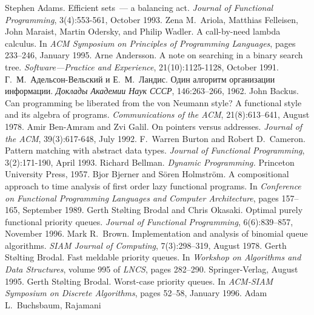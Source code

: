 \begin{thebibliography}{XXXXXXX}
 Stephen Adams. Efficient sets~--- a
  balancing act. \textit{Journal of Functional Programming},
  3(4):553-561, October 1993.
 Zena M.~Ariola, Matthias
  Felleisen, John Maraist, Martin Odersky, and Philip Wadler. A
  call-by-need lambda calculus. In \textit{ACM Symposium on Principles
  of Programming Languages}, pages 233--246, January 1995.
 Arne Andersson. A note on searching in
  a binary search tree. \textit{Software---Practice and Experience},
  21(10):1125-1128, October 1991.
 Г.~М.~Адельсон-Вельский
  и Е.~М.~Ландис. Один алгоритм организации
  информации. \textit{Доклады Академии Наук СССР}, 146:263--266, 1962.
 John Backus. Can programming be liberated
  from the von Neumann style? A functional style and its algebra of
  programs. \textit{Communications of the ACM}, 21(8):613--641, August 1978.
 Amir Ben-Amram and Zvi Galil. On
  pointers versus addresses. \textit{Journal of the ACM},
  39(3):617-648, July 1992.
 F.~Warren Burton and
  Robert D.~Cameron. Pattern matching with abstract data
  types. \textit{Journal of Functional Programming}, 3(2):171-190,
  April 1993.
 Richard Bellman. \textit{Dynamic
    Programming.}\/ Princeton University Press, 1957.
 Bjor Bjerner and S\"oren
  Holmstr\"om. A compositional approach to time analysis of first
  order lazy functional programs. In \textit{Conference on Functional
    Programming Languages and Computer Architecture}, pages 157--165,
  September 1989.
 Gerth St\o{}lting Brodal and Chris
  Okasaki. Optimal purely functional priority queues. \textit{Journal
    of Functional Programming}, 6(6):839--857, November 1996.
 Mark R.~Brown. Implementation and analysis
  of binomial queue algorithms. \textit{SIAM Journal of Computing},
  7(3):298--319, August 1978.
 Gerth St\o{}lting Brodal. Fast meldable
  priority queues. In \textit{Workshop on Algorithms and Data
    Structures}, volume 995 of \textit{LNCS}, pages
  282--290. Springer-Verlag, August 1995.
 Gerth St\o{}lting Brodal. Worst-case
  priority queues. In \textit{ACM-SIAM Symposium on Discrete
    Algorithms}, pages 52--58, January 1996.
 Adam L.~Buchsbaum, Rajamani

\end{thebibliography}

